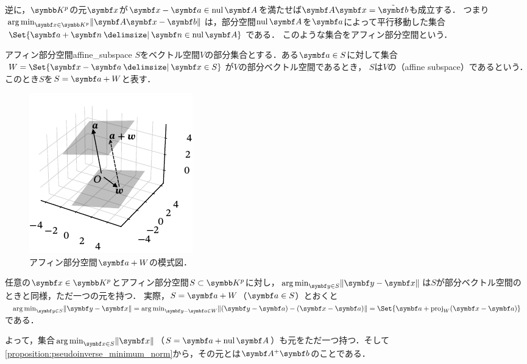 \documentclass[../../main]{subfiles}
\begin{document}
逆に，\(\numset{K}^p\)の元\(\vect{x}\)が\(\vect{x}-\vect{a}\in\nulsp\mat{A}\)を満たせば\(\mat{A}\vect{x}=\tilde{\vect{b}}\)も成立する．
つまり\(\argmin_{\vect{x}\in\numset{K}^p}\vnorm{\mat{A}\vect{x}-\vect{b}}\)は，部分空間\(\nulsp\mat{A}\)を\(\vect{a}\)によって平行移動した集合\(\Set{\vect{a}+\vect{n}\given\vect{n}\in\nulsp\mat{A}}\)である．
このような集合をアフィン部分空間という．

\begin{definition}{アフィン部分空間}{affine_subspace}
  \(S\)をベクトル空間\(V\)の部分集合とする．ある\(\vect{a}\in S\)に対して集合\(W=\Set{\vect{x}-\vect{a}\given\vect{x}\in S}\)が\(V\)の部分ベクトル空間であるとき，
  \(S\)は\(V\)の（affine subspace）であるという．このとき\(S\)を\(S=\vect{a}+W\)と表す．
\end{definition}

\begin{figure}[htbp]
  \centering
  \includegraphics{figures/affine.pdf}
  \caption{アフィン部分空間\(\vect{a}+W\)の模式図．}
\end{figure}

任意の\(\vect{x}\in\numset{K}^p\)とアフィン部分空間\(S\subset\numset{K}^p\)に対し，\(\argmin_{\vect{y}\in S}\vnorm{\vect{y}-\vect{x}}\)は\(S\)が部分ベクトル空間のときと同様，ただ一つの元を持つ．
実際，\(S=\vect{a}+W\)（\(\vect{a}\in S\)）とおくと\(\argmin_{\vect{y}\in S}\vnorm{\vect{y}-\vect{x}}=\argmin_{\vect{y}-\vect{a}\in W}\vnorm{(\vect{y}-\vect{a})-(\vect{x}-\vect{a})}=\Set{\vect{a}+\proj_W(\vect{x}-\vect{a})}\)である．

よって，集合\(\argmin_{\vect{x}\in S}\vnorm{\vect{x}}\)（\(S=\vect{a}+\nulsp\mat{A}\)）も元をただ一つ持つ．そして\cref{proposition:pseudoinverse_minimum_norm}から，その元とは\(\pinv{\mat{A}}\vect{b}\)のことである．
\end{document}
